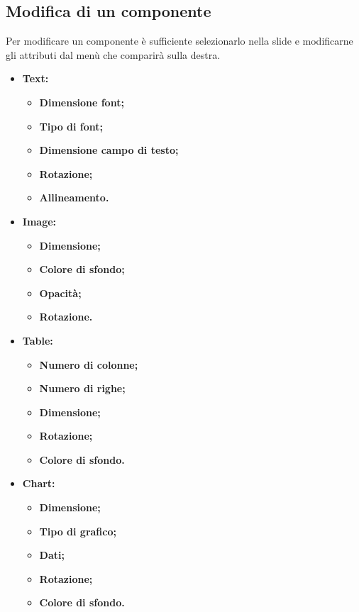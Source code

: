 \subsection{Modifica di un componente}
Per modificare un componente è sufficiente selezionarlo nella slide e modificarne gli attributi dal menù che comparirà sulla destra.
\begin{itemize}

	\item \textbf{Text:}
		\begin{itemize}
			\item \textbf{Dimensione font;}
			\item \textbf{Tipo di font;}
			\item \textbf{Dimensione campo di testo;}
			\item \textbf{Rotazione;}
			\item \textbf{Allineamento.}
		\end{itemize}
	
	\item \textbf{Image:}
		\begin{itemize}
			\item \textbf{Dimensione;}
			\item \textbf{Colore di sfondo;}
			\item \textbf{Opacità;}
			\item \textbf{Rotazione.}
		\end{itemize}

	\item \textbf{Table:}
		\begin{itemize}
			\item \textbf{Numero di colonne;}
			\item \textbf{Numero di righe;}
			\item \textbf{Dimensione;}
			\item \textbf{Rotazione;}
			\item \textbf{Colore di sfondo.}
		\end{itemize}
		
	\item \textbf{Chart:}
		\begin{itemize}
			\item \textbf{Dimensione;}
			\item \textbf{Tipo di grafico;}
			\item \textbf{Dati;}
			\item \textbf{Rotazione;}
			\item \textbf{Colore di sfondo.}
		\end{itemize}
	

\end{itemize}
